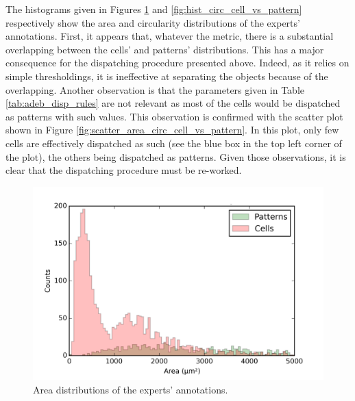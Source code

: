 The histograms given in Figures \ref{fig:hist_area_cell_vs_pattern} and \ref{fig:hist_circ_cell_vs_pattern} respectively show the area and circularity distributions of the experts' annotations. First, it appears that, whatever the metric, there is a substantial overlapping between the cells' and patterns' distributions. This has a major consequence for the dispatching procedure presented above. Indeed, as it relies on simple thresholdings, it is ineffective at separating the objects because of the overlapping. Another observation is that the parameters given in Table \ref{tab:adeb_disp_rules} are not relevant as most of the cells would be dispatched as patterns with such values. This observation is confirmed with the scatter plot shown in Figure \ref{fig:scatter_area_circ_cell_vs_pattern}. In this plot, only few cells are effectively dispatched as such (see the blue box in the top left corner of the plot), the others being dispatched as patterns. Given those observations, it is clear that the dispatching procedure must be re-worked.

\begin{figure}
	\center
 	\includegraphics[scale=0.75]{image/cells_patterns_real_area_0_5000.png}
	\caption{Area distributions of the experts' annotations.}
	\label{fig:hist_area_cell_vs_pattern}
\end{figure}

